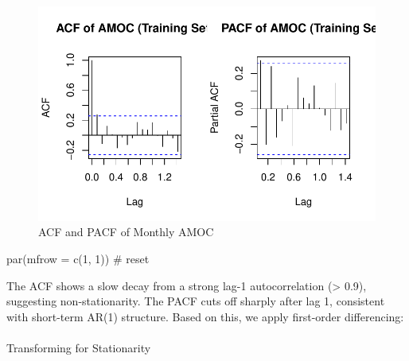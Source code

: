\documentclass[
  11pt,
]{article}
\makeatletter
\let\oldparagraph\paragraph
\renewcommand{\paragraph}{
    \@ifstar
      \xxxParagraphStar
      \xxxParagraphNoStar
  }
\newcommand{\xxxParagraphStar}[1]{\oldparagraph*{#1}\mbox{}}
\newcommand{\xxxParagraphNoStar}[1]{\oldparagraph{#1}\mbox{}}
\newenvironment{Shaded}{\begin{snugshade}}{\end{snugshade}}
\newcommand{\AttributeTok}[1]{\textcolor[rgb]{0.40,0.45,0.13}{#1}}
\newcommand{\CommentTok}[1]{\textcolor[rgb]{0.37,0.37,0.37}{#1}}
\newcommand{\DecValTok}[1]{\textcolor[rgb]{0.68,0.00,0.00}{#1}}
\newcommand{\FunctionTok}[1]{\textcolor[rgb]{0.28,0.35,0.67}{#1}}
\newcommand{\NormalTok}[1]{\textcolor[rgb]{0.00,0.23,0.31}{#1}}
\makeatother
\begin{document}
\begin{figure}[H]

{\centering \includegraphics{project_files/figure-pdf/fig-AMF+PACF-1.pdf}

}

\caption{ACF and PACF of Monthly AMOC}

\end{figure}%

\begin{Shaded}
\begin{Highlighting}[]
\FunctionTok{par}\NormalTok{(}\AttributeTok{mfrow =} \FunctionTok{c}\NormalTok{(}\DecValTok{1}\NormalTok{, }\DecValTok{1}\NormalTok{))  }\CommentTok{\# reset}
\end{Highlighting}
\end{Shaded}

The ACF shows a slow decay from a strong lag-1 autocorrelation
(\textgreater{} 0.9), suggesting non-stationarity. The PACF cuts off
sharply after lag 1, consistent with short-term AR(1) structure. Based
on this, we apply first-order differencing:

\paragraph{Transforming for
Stationarity}\label{transforming-for-stationarity}
\end{document}
